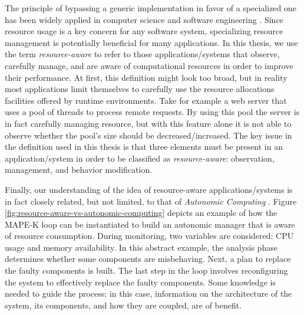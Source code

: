 The principle of bypassing a generic implementation in favor of a specialized one has been widely applied in computer science and software engineering \cite{engler1995exokernel, Munro1996,Dragos:2009:CGT:1565824.1565830,Marinos:2014:NSS:2619239.2626311}.
Since resource usage is a key concern for any software system, specializing resource management is potentially beneficial for many applications.
In this thesis, we use the term \textit{resource-aware} to refer to those applications/systems that observe, carefully manage, and are aware of computational resources in order to improve their performance. 
At first, this definition might look too broad, but in reality most applications limit themselves to carefully use the resource allocations facilities offered by runtime environments.
Take for example a web server that uses a pool of threads to process remote requests.
By using this pool the server is in fact carefully managing resource, but with this feature alone it is not able to observe whether the pool's size should be decreased/increased.
The key issue in the definition used in this thesis is that three elements must be present in an application/system in order to be classified as \textit{resource-aware}: observation, management, and behavior modification.

 
Finally, our understanding of the idea of resource-aware applications/systems is in fact closely related, but not limited, to that of \textit{Autonomic Computing} \cite{Horn2001,kephart03,Brun:2009:ESS:1573856.1573860}.
Figure \ref{fig:resource-aware-vs-autonomic-computing} depicts an example of how the MAPE-K loop can be instantiated to build an autonomic manager that is aware of resource consumption.
During monitoring, two variables are considered: CPU usage and memory availability.
In this abstract example, the analysis phase determines whether some components are misbehaving.
Next, a plan to replace the faulty components is built.
The last step in the loop involves reconfiguring the system to effectively replace the faulty components.
Some knowledge is needed to guide the process; in this case, information on the architecture of the system, its components, and how they are coupled, are of benefit.

